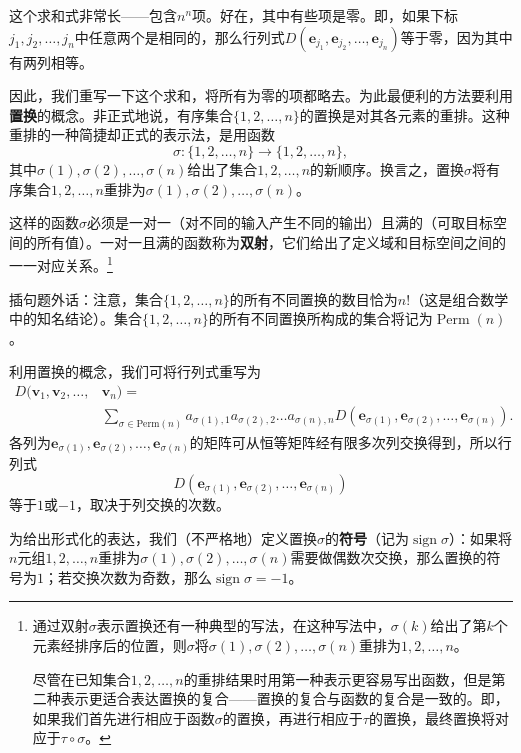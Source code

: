 这个求和式非常长——包含$n^n$项。好在，其中有些项是零。即，如果下标$j_1,j_2,\dots,j_n$中任意两个是相同的，那么行列式$D(\mathbf{e}_{j_1},\mathbf{e}_{j_2},\ldots,\mathbf{e}_{j_n})$等于零，因为其中有两列相等。

因此，我们重写一下这个求和，将所有为零的项都略去。为此最便利的方法要利用\textbf{置换}的概念。非正式地说，有序集合$\{1,2,\dots,n\}$的置换是对其各元素的重排。这种重排的一种简捷却正式的表示法，是用函数\[\sigma:\{1,2,\ldots,n\}\to\{1,2,\ldots,n\},\]
其中$\sigma(1),\sigma(2),\dots,\sigma(n)$给出了集合$1,2,\ldots,n$的新顺序。换言之，置换$\sigma$将有序集合$1,2,\ldots,n$重排为$\sigma(1),\sigma(2),\dots,\sigma(n)$。

这样的函数$\sigma$必须是一对一（对不同的输入产生不同的输出）且满的（可取目标空间的所有值）。一对一且满的函数称为\textbf{双射}，它们给出了定义域和目标空间之间的一一对应关系。\footnote{通过双射$\sigma$表示置换还有一种典型的写法，在这种写法中，$\sigma(k)$给出了第$k$个元素经排序后的位置，则$\sigma$将$\sigma(1),\sigma(2),\dots,\sigma(n)$重排为$1,2,\ldots,n$。

\noindent 尽管在已知集合$1,2,\ldots,n$的重排结果时用第一种表示更容易写出函数，但是第二种表示更适合表达置换的复合——置换的复合与函数的复合是一致的。即，如果我们首先进行相应于函数$\sigma$的置换，再进行相应于$\tau$的置换，最终置换将对应于$\tau\circ\sigma$。}

插句题外话：注意，集合$\{1,2,\dots,n\}$的所有不同置换的数目恰为$n!$（这是组合数学中的知名结论）。集合$\{1,2,\dots,n\}$的所有不同置换所构成的集合将记为$\operatorname{Perm}(n)$。

利用置换的概念，我们可将行列式重写为
\[
  \begin{aligned}
    D(\mathbf{v}_{1},\mathbf{v}_{2},\ldots,&\mathbf{v}_{n})=\\
    &\sum_{\sigma\in\mathrm{Perm}(n)}a_{\sigma(1),1}a_{\sigma(2),2}\ldots a_{\sigma(n),n}D(\mathbf{e}_{\sigma(1)},\mathbf{e}_{\sigma(2)},\ldots,\mathbf{e}_{\sigma(n)}).
  \end{aligned}
\]
各列为$\mathbf{e}_{\sigma(1)},\mathbf{e}_{\sigma(2)},\ldots,\mathbf{e}_{\sigma(n)}$的矩阵可从恒等矩阵经有限多次列交换得到，所以行列式\[D(\mathbf{e}_{\sigma(1)},\mathbf{e}_{\sigma(2)},\ldots,\mathbf{e}_{\sigma(n)})\]
等于$1$或$-1$，取决于列交换的次数。

为给出形式化的表达，我们（不严格地）定义置换$\sigma$的\textbf{符号}（记为$\operatorname{sign}\sigma$）：如果将$n$元组$1,2,\ldots,n$重排为$\sigma(1),\sigma(2),\dots,\sigma(n)$需要做偶数次交换，那么置换的符号为$1$；若交换次数为奇数，那么$\operatorname{sign}\sigma=-1$。

